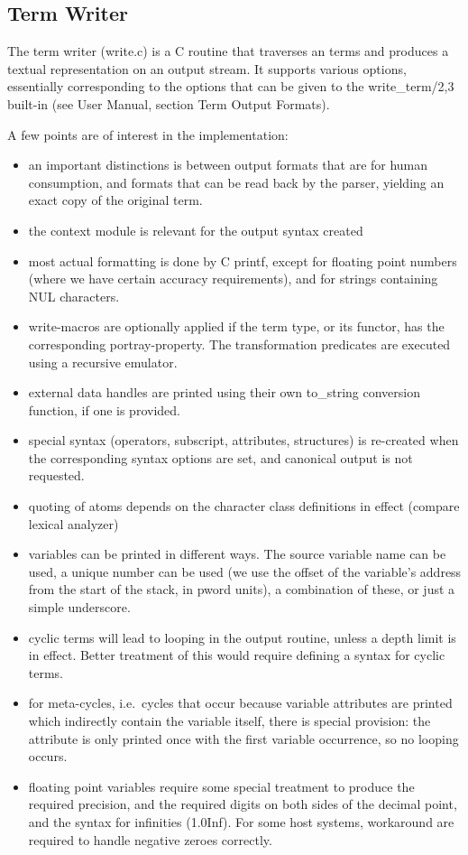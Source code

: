 \subsection{Term Writer}

The term writer (write.c) is a C routine that traverses an {\eclipse}
terms and produces a textual representation on an output stream.
It supports various options, essentially corresponding to the options
that can be given to the write_term/2,3 built-in (see User Manual, section
Term Output Formats).

A few points are of interest in the implementation:
\begin{itemize}
\item an important distinctions is between output formats that are for
	human consumption, and formats that can be read back by the parser,
	yielding an exact copy of the original term.
\item the context module is relevant for the output syntax created
\item most actual formatting is done by C printf, except for floating
	point numbers (where we have certain accuracy requirements),
	and for strings containing NUL characters.
\item write-macros are optionally applied if the term type, or its
	functor, has the corresponding portray-property. The transformation
	predicates are executed using a recursive emulator.
\item external data handles are printed using their own to_string conversion
	function, if one is provided.
\item special syntax (operators, subscript, attributes, structures) is
	re-created when the corresponding syntax options are set, and
	canonical output is not requested.
\item quoting of atoms depends on the character class definitions in effect
	(compare lexical analyzer)
\item variables can be printed in different ways. The source variable name
	can be used, a unique number can be used (we use the offset of
	the variable's address from the start of the stack, in pword units),
	a combination of these, or just a simple underscore.
\item cyclic terms will lead to looping in the output routine, unless a
	depth limit is in effect.  Better treatment of this would require
	defining a syntax for cyclic terms.
\item for meta-cycles, i.e.\ cycles that occur because variable attributes
	are printed which indirectly contain the variable itself, there is
	special provision: the attribute is only printed once with the first
	variable occurrence, so no looping occurs.
\item floating point variables require some special treatment to produce
	the required precision, and the required digits on both sides of
	the decimal point, and the {\eclipse} syntax for infinities
	(1.0Inf). For some host systems, workaround are required to handle
	negative zeroes correctly.
\end{itemize}



